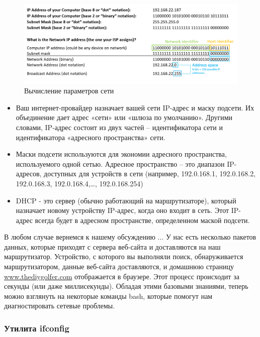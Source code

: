 \documentclass[12pt]{article}
\providecommand{\tightlist}{%
  \setlength{\itemsep}{0pt}\setlength{\parskip}{0pt}}
\begin{document}
\begin{figure}[tbh]
  \centering
  \includegraphics[width=0.9\linewidth]{blog/2019/bash-essentials/ipaddresses.PNG}

  \caption{Вычисление параметров сети}
  \label{fig:netparms}
\end{figure}
\begin{itemize}
\tightlist
\item
  Ваш интернет-провайдер назначает вашей сети IP-адрес и маску подсети.
  Их объединение дает адрес «сети» или «шлюза по умолчанию». Другими
  словами, IP-адрес состоит из двух частей -- идентификатора сети и
  идентификатора «адресного пространства» сети.
\item
  Маски подсети используются для экономии адресного пространства,
  используемого одной сетью. Адресное пространство -- это диапазон
  IP-адресов, доступных для устройств в сети (например, 192.0.168.1,
  192.0.168.2, 192.0.168.3, 192.0.168.4,\ldots, 192.0.168.254)
\item
  DHCP - это сервер (обычно работающий на маршрутизаторе), который
  назначает новому устройству IP-адрес, когда оно входит в сеть. Этот
  IP-адрес всегда будет в адресном пространстве, определенном маской
  подсети.
\end{itemize}

В любом случае вернемся к нашему обсуждению ... У нас есть несколько
пакетов данных, которые приходят с сервера веб-сайта и доставляются на
наш маршрутизатор. Устройство, с которого вы выполняли поиск,
обнаруживается маршрутизатором, данные веб-сайта доставляются, и
домашнюю страницу
\href{http://www.thediygolfer.com}{www.thediygolfer.com} отображается в
браузере. Этот процесс происходит за секунды (или даже миллисекунды).
Обладая этими базовыми знаниями, теперь можно взглянуть на некоторые
команды bash, которые помогут нам диагностировать сетевые проблемы.

\hypertarget{ifconfig}{%
\subsubsection{\texorpdfstring{\protect\hyperlink{ifconfig}{}Утилита
ifconfig}{Утилита ifconfig}}\label{ifconfig}}
\end{document}
